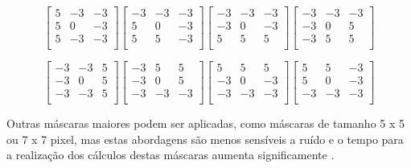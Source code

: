 \documentclass[
	12pt,				%
	oneside,			%
	a4paper,			%
	english,			%
	french,				%
	spanish,			%
	brazil,				%
	]{abntex2}
\begin{document}
\[
\begin{bmatrix}
     5 & -3 & -3   \\ 
	 5 &  0 & -3   \\ 
	 5 & -3 & -3   \\    
\end{bmatrix} 
\begin{bmatrix}
    -3 & -3 & -3   \\
	 5 &  0 & -3   \\
	 5 &  5 & -3   \\
\end{bmatrix}
\begin{bmatrix}
    -3 & -3 & -3   \\
	-3 &  0 & -3   \\
	 5 &  5 &  5   \\
\end{bmatrix} 
\begin{bmatrix}
    -3 & -3 & -3   \\
	-3 &  0 &  5   \\
	-3 &  5 &  5   \\
\end{bmatrix}
\]

\[
\begin{bmatrix}
    -3 & -3 &  5   \\ 
	-3 &  0 &  5   \\ 
	-3 & -3 &  5   \\ 
\end{bmatrix} 
\begin{bmatrix}
    -3 &  5 &  5   \\ 
	-3 &  0 &  5   \\ 
	-3 & -3 & -3   \\ 
\end{bmatrix}
\begin{bmatrix}
     5 &  5 &  5   \\ 
	-3 &  0 & -3   \\ 
	-3 & -3 & -3   \\ 
\end{bmatrix} 
\begin{bmatrix}
     5 &  5 & -3   \\ 
	 5 &  0 & -3   \\ 
	-3 & -3 & -3   \\ 
\end{bmatrix}
\]

Outras máscaras maiores podem ser aplicadas, como máscaras de tamanho 5 x 5 ou 7 x 7 pixel, mas estas abordagens são menos sensíveis a ruído e o tempo para a realização dos cálculos destas máscaras aumenta significamente \cite{pedriniSchwartz:2008}.
\end{document}
